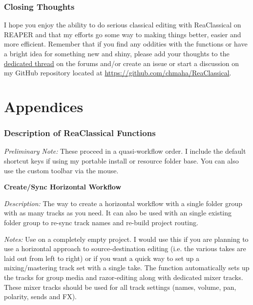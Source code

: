 \documentclass[10pt,american]{article}
\begin{document}
\section{Closing Thoughts}
\noindent\begin{flushleft} I hope you enjoy the ability to do serious classical
editing with ReaClassical on REAPER and that my efforts go some way to making
things better, easier and more efficient. Remember that if you find any oddities
with the functions or have a bright idea for something new and shiny, please add
your thoughts to the
\href{https://forum.cockos.com/showthread.php?t=265145}{dedicated thread} on the
forums and/or create an issue or start a discussion on my GitHub repository
located at
\href{https://github.com/chmaha/ReaClassical}{https://github.com/chmaha/ReaClassical}.
\par\end{flushleft}

\pagebreak{}

\appendix

\part{Appendices}

\section{Description of ReaClassical Functions}

\emph{Preliminary Note: }These proceed in a quasi-workflow order. I include the
default shortcut keys if using my portable install or resource folder base. You
can also use the custom toolbar via the mouse. 

\textbf{Create/Sync Horizontal Workflow }

\emph{Description: }The way to create a horizontal workflow with a single folder
group with as many tracks as you need. It can also be used with an single
existing folder group to re-sync track names and re-build project routing.

\emph{Notes: }Use on a completely empty project. I would use this if you are
planning to use a horizontal approach to source-destination editing (i.e. the
various takes are laid out from left to right) or if you want a quick way to set
up a mixing/mastering track set with a single take. The function automatically
sets up the tracks for group media and razor-editing along with dedicated mixer
tracks. These mixer tracks should be used for all track settings (names, volume,
pan, polarity, sends and FX).
\end{document}
